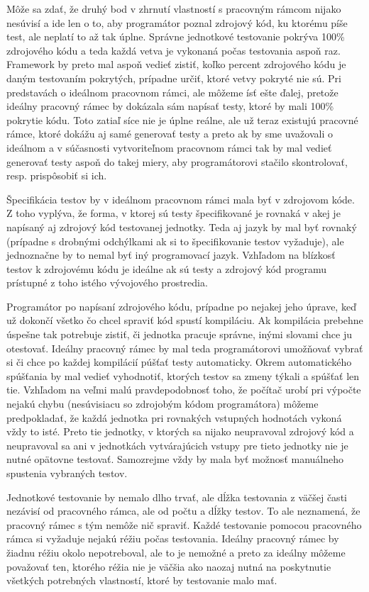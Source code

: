 \documentclass[11pt,twoside,slovak,a4paper]{article}
\begin{document}
		Môže sa zdať, že druhý bod v zhrnutí vlastností s pracovným rámcom nijako nesúvisí a ide len o to, aby programátor poznal zdrojový kód, ku ktorému píše test, ale neplatí to až tak úplne. Správne jednotkové testovanie pokrýva 100\% zdrojového kódu a teda každá vetva je vykonaná počas testovania aspoň raz. Framework by preto mal aspoň vedieť zistiť, koľko percent zdrojového kódu je daným testovaním pokrytých, prípadne určiť, ktoré vetvy pokryté nie sú. Pri predstavách o ideálnom pracovnom rámci, ale môžeme ísť ešte ďalej, pretože ideálny pracovný rámec by dokázala sám napísať testy, ktoré by mali 100\% pokrytie kódu. Toto zatiaľ síce nie je úplne reálne, ale už teraz existujú pracovné rámce, ktoré dokážu aj samé generovať testy a preto ak by sme uvažovali o ideálnom a v súčasnosti vytvoriteľnom pracovnom rámci tak by mal vedieť generovať testy aspoň do takej miery, aby programátorovi stačilo skontrolovať, resp. prispôsobiť si ich.
		
		Špecifikácia testov by v ideálnom pracovnom rámci mala byť v zdrojovom kóde. Z toho vyplýva, že forma, v ktorej sú testy špecifikované je rovnaká v akej je napísaný aj zdrojový kód testovanej jednotky. Teda aj jazyk by mal byť rovnaký (prípadne s drobnými odchýlkami ak si to špecifikovanie testov vyžaduje), ale jednoznačne by to nemal byť iný programovací jazyk. Vzhľadom na blízkosť testov k zdrojovému kódu je ideálne ak sú testy a zdrojový kód programu prístupné z toho istého vývojového prostredia.
		
		Programátor po napísaní zdrojového kódu, prípadne po nejakej jeho úprave, keď už dokončí všetko čo chcel spraviť kód spustí kompiláciu. Ak kompilácia prebehne úspešne tak potrebuje zistiť, či jednotka pracuje správne, inými slovami chce ju otestovať. Ideálny pracovný rámec by mal teda programátorovi umožňovať vybrať si či chce po každej kompilácií púšťať testy automaticky. Okrem automatického spúšťania by mal vedieť vyhodnotiť, ktorých testov sa zmeny týkali a spúšťať len tie. Vzhľadom na veľmi malú pravdepodobnosť toho, že počítač urobí pri výpočte nejakú chybu (nesúvisiacu so zdrojobým kódom programátora) môžeme predpokladať, že každá jednotka pri rovnakých vstupných hodnotách vykoná vždy to isté. Preto tie jednotky, v ktorých sa nijako neupravoval zdrojový kód a neupravoval sa ani v jednotkách vytvárajúcich vstupy pre tieto jednotky nie je nutné opätovne testovať. Samozrejme vždy by mala byť možnosť manuálneho spustenia vybraných testov.
				
		Jednotkové testovanie by nemalo dlho trvať, ale dĺžka testovania z väčšej časti nezávisí od pracovného rámca, ale od počtu a dĺžky testov. To ale neznamená, že pracovný rámec s tým nemôže nič spraviť. Každé testovanie pomocou pracovného rámca si vyžaduje nejakú réžiu počas testovania. Ideálny pracovný rámec by žiadnu réžiu okolo nepotreboval, ale to je nemožné a preto za ideálny môžeme považovať ten, ktorého réžia nie je väčšia ako naozaj nutná na poskytnutie všetkých potrebných vlastností, ktoré by testovanie malo mať. 
		
\end{document}
